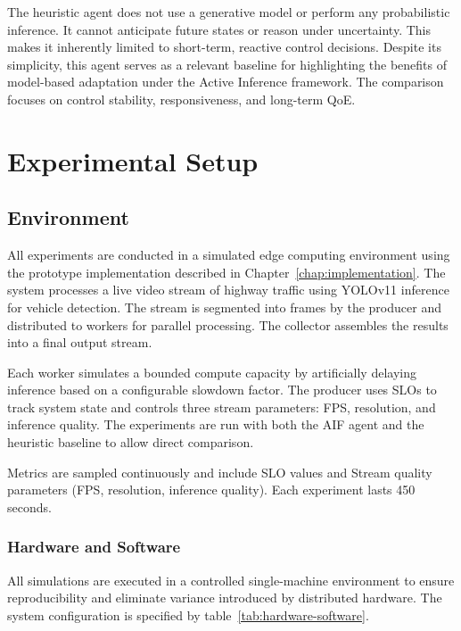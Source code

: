 The heuristic agent does not use a generative model or perform any probabilistic inference. It cannot anticipate future states or reason under uncertainty. This makes it inherently limited to short-term, reactive control decisions. Despite its simplicity, this agent serves as a relevant baseline for highlighting the benefits of model-based adaptation under the Active Inference framework. The comparison focuses on control stability, responsiveness, and long-term QoE.

\section{Experimental Setup}
\label{sec:evaluation-setup}

\subsection{Environment}
\label{sec:evaluation-environment}

All experiments are conducted in a simulated edge computing environment using the prototype implementation described in Chapter~\ref{chap:implementation}. The system processes a live video stream of highway traffic using YOLOv11 inference for vehicle detection. The stream is segmented into frames by the producer and distributed to workers for parallel processing. The collector assembles the results into a final output stream.

Each worker simulates a bounded compute capacity by artificially delaying inference based on a configurable slowdown factor. The producer uses SLOs to track system state and controls three stream parameters: FPS, resolution, and inference quality. The experiments are run with both the AIF agent and the heuristic baseline to allow direct comparison.

Metrics are sampled continuously and include SLO values and Stream quality parameters (FPS, resolution, inference quality). Each experiment lasts 450 seconds.

\subsubsection{Hardware and Software}
All simulations are executed in a controlled single-machine environment to ensure reproducibility and eliminate variance introduced by distributed hardware. The system configuration is specified by table~\ref{tab:hardware-software}.

